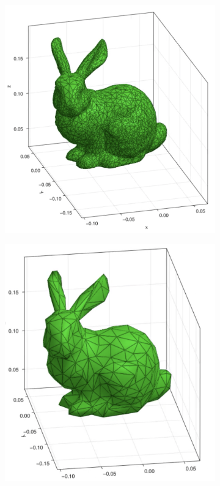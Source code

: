 \documentclass{ijclclp}
\begin{document}
\begin{itemize}
\begin{figure}[h]
\begin{subfigure}{.4\textwidth}
  \includegraphics[width=\linewidth]{buni2.png}
\end{subfigure}
\begin{subfigure}{.4\textwidth}
  \centering
  \includegraphics[width=\linewidth]{buni4.png}

\end{subfigure}
\end{figure}
\end{itemize}
\end{document}
